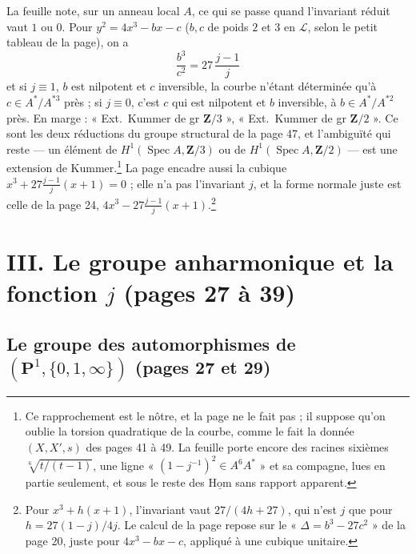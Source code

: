 \documentclass[11pt,a4paper]{article}
\begin{document}
La feuille
note, sur un anneau local $A$, ce qui se passe quand l'invariant réduit vaut $1$
ou $0$. Pour $y^2 = 4x^3 - bx - c$ ($b, c$ de poids $2$ et $3$ en
$\mathcal{L}$, selon le petit tableau de la page), on a
\[
\boxed{\;\frac{b^3}{c^2} = 27\,\frac{j-1}{j}\;}
\]
et si $j \equiv 1$, $b$ est nilpotent et $c$ inversible, la courbe n'étant
déterminée qu'à $c \in A^*/A^{*3}$ près ; si $j \equiv 0$, c'est $c$ qui est
nilpotent et $b$ inversible, à $b \in A^*/A^{*2}$ près. En marge : « Ext.\
Kummer de gr $\mathbf{Z}/3$ », « Ext.\ Kummer de gr $\mathbf{Z}/2$ ». Ce sont les
deux réductions du groupe structural de la page 47, et l'ambiguïté qui reste ---
un élément de $H^1(\operatorname{Spec}A, \mathbf{Z}/3)$ ou de
$H^1(\operatorname{Spec}A, \mathbf{Z}/2)$ --- est une extension de
Kummer.\footnote{Ce rapprochement est le nôtre, et la page ne le fait pas ; il
suppose qu'on oublie la torsion quadratique de la courbe, comme le fait la
donnée $(X, X', s)$ des pages 41 à 49. La feuille porte encore des racines
sixièmes $\sqrt[6]{t/(t-1)}$, une ligne « $(1 - j^{-1})^2 \in A^6A^*$ » et sa
compagne, lues en partie seulement, et sous le reste des
$\underline{\mathrm{Hom}}$ sans rapport apparent.} La page encadre aussi la
cubique $x^3 + 27\frac{j-1}{j}(x+1) = 0$ ; elle n'a pas l'invariant $j$, et la
forme normale juste est celle de la page 24, $4x^3 - 27\frac{j-1}{j}(x+1)$.\footnote{Pour
$x^3 + h(x+1)$, l'invariant vaut $27/(4h + 27)$, qui n'est $j$ que pour $h =
27(1-j)/4j$. Le calcul de la page repose sur le « $\Delta = b^3 - 27c^2$ » de la
page 20, juste pour $4x^3 - bx - c$, appliqué à une cubique unitaire.}

\section*{III. Le groupe anharmonique et la fonction $j$ (pages 27 à 39)}

\subsection*{Le groupe des automorphismes de $(\mathbf{P}^1, \{0, 1, \infty\})$ (pages 27 et 29)}
\end{document}
